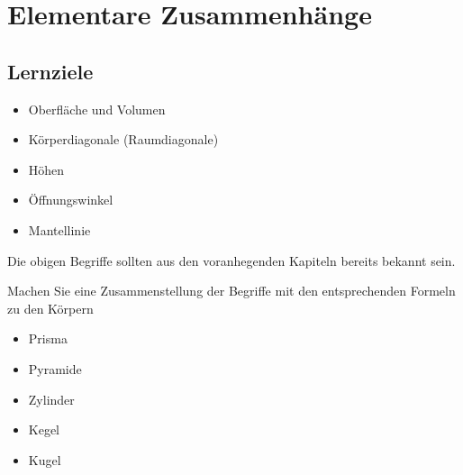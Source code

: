 \section{Elementare Zusammenhänge}
\sectuntertitel{}


\subsection*{Lernziele}
\begin{itemize}
\item Oberfläche und Volumen
\item Körperdiagonale (Raumdiagonale)
\item Höhen
\item Öffnungswinkel
\item Mantellinie
\end{itemize}

Die obigen Begriffe sollten aus den voranhegenden Kapiteln bereits
bekannt sein.

Machen Sie eine Zusammenstellung der Begriffe mit den entsprechenden
Formeln zu den Körpern
\begin{itemize}
\item Prisma
\item Pyramide
\item Zylinder
\item Kegel
\item Kugel
\end{itemize}

\newpage
